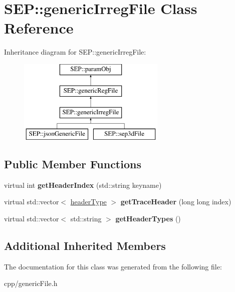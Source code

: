 \hypertarget{class_s_e_p_1_1generic_irreg_file}{}\section{S\+EP\+:\+:generic\+Irreg\+File Class Reference}
\label{class_s_e_p_1_1generic_irreg_file}
Inheritance diagram for S\+EP\+:\+:generic\+Irreg\+File\+:\begin{figure}[H]
\begin{center}
\leavevmode
\includegraphics[height=4.000000cm]{class_s_e_p_1_1generic_irreg_file}
\end{center}
\end{figure}
\subsection*{Public Member Functions}
\begin{DoxyCompactItemize}
\item 
\mbox{\label{class_s_e_p_1_1generic_irreg_file_a066af08d15f761b08d06931e451ce533}} 
virtual int {\bfseries get\+Header\+Index} (std\+::string keyname)
\item 
\mbox{\label{class_s_e_p_1_1generic_irreg_file_a7991dede30e8615b0a48bb37560070c6}} 
virtual std\+::vector$<$ \hyperlink{union_s_e_p_1_1header_type}{header\+Type} $>$ {\bfseries get\+Trace\+Header} (long long index)
\item 
\mbox{\label{class_s_e_p_1_1generic_irreg_file_a8ded47a407ef48f99174ba32b9f28316}} 
virtual std\+::vector$<$ std\+::string $>$ {\bfseries get\+Header\+Types} ()
\end{DoxyCompactItemize}
\subsection*{Additional Inherited Members}


The documentation for this class was generated from the following file\+:\begin{DoxyCompactItemize}
\item 
cpp/generic\+File.\+h\end{DoxyCompactItemize}
